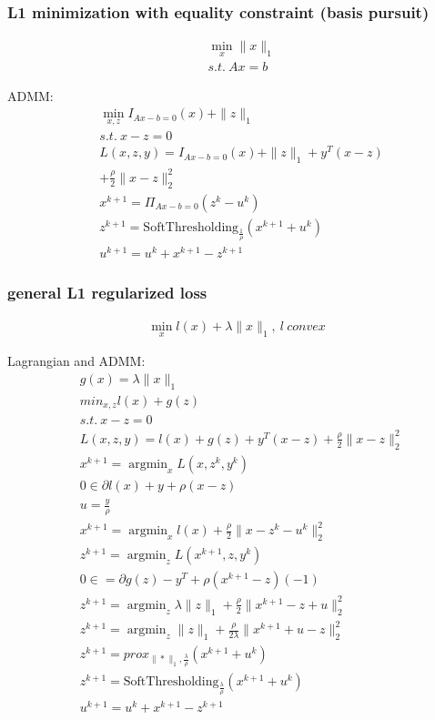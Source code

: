 \documentclass[8pt]{report}
\DeclareMathOperator*{\argmin}{argmin}
\newcommand{\norm}[1]{\|#1\|}
\begin{document}
\begin{multicols*}{2}
  \subsubsection{L1 minimization with equality constraint (basis pursuit)}
  \begin{align*}
    &\min_x \norm{x}_1\\
    &s.t.\ Ax=b
  \end{align*}

  ADMM:
  \begin{align*}
    &\min_{x,z} I_{Ax-b=0}(x) + \norm{z}_1\\
    &s.t.\ x - z = 0\\
    &L(x,z,y) = I_{Ax-b=0}(x) + \norm{z}_1 + y^T(x-z)\\
    &+ \frac{\rho}{2}\norm{x-z}_2^2\\
    &x^{k+1} = \Pi_{Ax-b=0}(z^k-u^k)\\
    &z^{k+1} = \text{SoftThresholding}_{\frac{1}{\rho}}(x^{k+1}+u^k)\\
    &u^{k+1} = u^k + x^{k+1} - z^{k+1}
  \end{align*}
  
  \vfill\null
  \columnbreak

  \subsubsection{general L1 regularized loss}
  \begin{align*}
    \min_x l(x) + \lambda \norm{x}_1,\ l\ convex
  \end{align*}

  Lagrangian and ADMM:
  \begin{align*}
    &g(x)=\lambda \norm{x}_1\\
    &min_{x,z} l(x) + g(z)\\
    &s.t.\ x-z=0\\
    &L(x,z,y) = l(x) + g(z) + y^T (x-z)+\frac{\rho}{2}\norm{x-z}_2^2\\
    &x^{k+1}=\argmin_x L(x, z^k, y^k)\\
    &0 \in \partial l(x) + y + \rho(x-z)\\
    &u=\frac{y}{\rho}\\
    &x^{k+1}=\argmin_x l(x) + \frac{\rho}{2}\norm{x-z^k-u^k}_2^2\\
    &z^{k+1}=\argmin_z L(x^{k+1}, z, y^k)\\
    &0 \in = \partial g(z) - y^T + \rho (x^{k+1}-z)(-1)\\
    &z^{k+1}=\argmin_z \lambda \norm{z}_1 + \frac{\rho}{2}\norm{x^{k+1}-z+u}_2^2\\
    &z^{k+1}=\argmin_z \norm{z}_1 + \frac{\rho}{2\lambda}\norm{x^{k+1}+u-z}_2^2\\
    &z^{k+1}=prox_{\norm{*}_1, \frac{\lambda}{\rho}}(x^{k+1}+u^k)\\
    &z^{k+1}=\text{SoftThresholding}_{\frac{\lambda}{\rho}}(x^{k+1}+u^k)\\
    &u^{k+1} = u^k + x^{k+1} - z^{k+1}
  \end{align*}


\end{multicols*}
\end{document}
